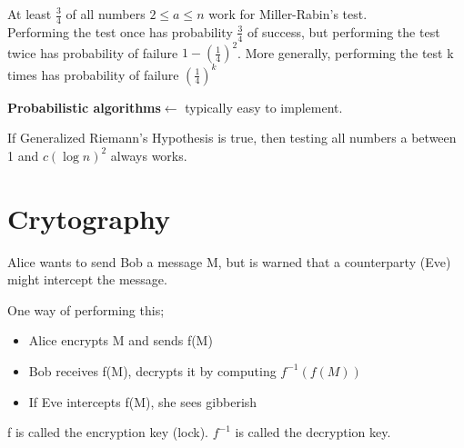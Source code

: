 \documentclass[9pt, letterpaper, oneside]{article}
\begin{document}
At least $\frac{3}{4}$ of all numbers $2 \leq a \leq n$ work for Miller-Rabin's test.\\
Performing the test once has probability $ \displaystyle \frac{3}{4}$ of success, but performing the test twice has probability of failure $\displaystyle 1 - (\frac{1}{4})^2$. More generally, performing the test k times has probability of failure $\displaystyle (\frac{1}{4})^k$

\textbf{Probabilistic algorithms}$\leftarrow$ typically easy to implement.

If Generalized Riemann's Hypothesis is true, then testing all numbers a between 1 and $c(\log n)^2$ always works.

\section{Crytography}

Alice wants to send Bob a message M, but is warned that a counterparty (Eve) might intercept the message.

One way of performing this;
\begin{itemize}
    \item Alice encrypts M and sends f(M)
    \item Bob receives f(M), decrypts it by computing $f^{-1}(f(M))$
    \item If Eve intercepts f(M), she sees gibberish
\end{itemize}

f is called the encryption key (lock).
$f^{-1}$ is called the decryption key.
\end{document}
